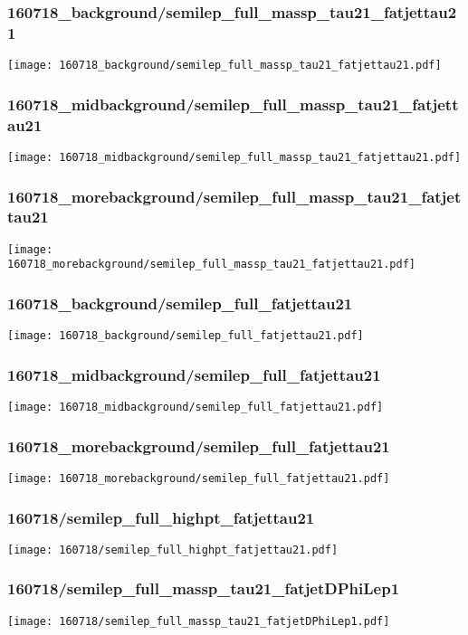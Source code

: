 \begin{frame}
   \frametitle{\small 160718\_background/semilep\_full\_massp\_tau21\_fatjettau21}
   \centering
   \texttt{[image: 160718\_background/semilep\_full\_massp\_tau21\_fatjettau21.pdf]}
\end{frame}

\begin{frame}
   \frametitle{\small 160718\_midbackground/semilep\_full\_massp\_tau21\_fatjettau21}
   \centering
   \texttt{[image: 160718\_midbackground/semilep\_full\_massp\_tau21\_fatjettau21.pdf]}
\end{frame}

\begin{frame}
   \frametitle{\small 160718\_morebackground/semilep\_full\_massp\_tau21\_fatjettau21}
   \centering
   \texttt{[image: 160718\_morebackground/semilep\_full\_massp\_tau21\_fatjettau21.pdf]}
\end{frame}

\begin{frame}
   \frametitle{\small 160718\_background/semilep\_full\_fatjettau21}
   \centering
   \texttt{[image: 160718\_background/semilep\_full\_fatjettau21.pdf]}
\end{frame}

\begin{frame}
   \frametitle{\small 160718\_midbackground/semilep\_full\_fatjettau21}
   \centering
   \texttt{[image: 160718\_midbackground/semilep\_full\_fatjettau21.pdf]}
\end{frame}

\begin{frame}
   \frametitle{\small 160718\_morebackground/semilep\_full\_fatjettau21}
   \centering
   \texttt{[image: 160718\_morebackground/semilep\_full\_fatjettau21.pdf]}
\end{frame}

\begin{frame}
   \frametitle{\small 160718/semilep\_full\_highpt\_fatjettau21}
   \centering
   \texttt{[image: 160718/semilep\_full\_highpt\_fatjettau21.pdf]}
\end{frame}

\begin{frame}
   \frametitle{\small 160718/semilep\_full\_massp\_tau21\_fatjetDPhiLep1}
   \centering
   \texttt{[image: 160718/semilep\_full\_massp\_tau21\_fatjetDPhiLep1.pdf]}
\end{frame}

